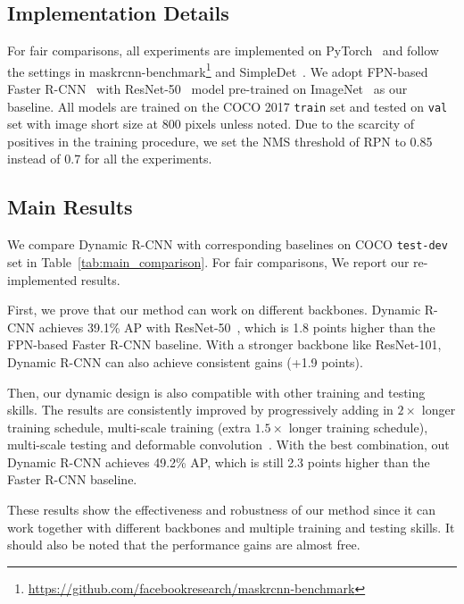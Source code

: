 \documentclass[runningheads]{llncs}
\begin{document}
\subsection{Implementation Details}

For fair comparisons, all experiments are implemented on PyTorch~\cite{PyTorch} and follow the settings in maskrcnn-benchmark\footnote[2]{\url{https://github.com/facebookresearch/maskrcnn-benchmark}} and SimpleDet~\cite{SimpleDet}. We adopt FPN-based Faster R-CNN~\cite{FasterRCNN,FPN} with ResNet-50~\cite{ResNet} model pre-trained on ImageNet~\cite{ImageNet} as our baseline. All models are trained on the COCO 2017 \texttt{train} set and tested on \texttt{val} set with image short size at 800 pixels unless noted. Due to the scarcity of positives in the training procedure, we set the NMS threshold of RPN to 0.85 instead of 0.7 for all the experiments.

\subsection{Main Results}

We compare Dynamic R-CNN with corresponding baselines on COCO \texttt{test-dev} set in Table~\ref{tab:main_comparison}. For fair comparisons, We report our re-implemented results.

First, we prove that our method can work on different backbones. Dynamic R-CNN achieves 39.1\% AP with ResNet-50~\cite{ResNet}, which is 1.8 points higher than the FPN-based Faster R-CNN baseline. With a stronger backbone like ResNet-101, Dynamic R-CNN can also achieve consistent gains (+1.9 points).

Then, our dynamic design is also compatible with other training and testing skills.
The results are consistently improved by progressively adding in $2\times$ longer training schedule, multi-scale training (extra $1.5\times$ longer training schedule), multi-scale testing and deformable convolution~\cite{DCNv2}. With the best combination, out Dynamic R-CNN achieves 49.2\% AP, which is still 2.3 points higher than the Faster R-CNN baseline.

These results show the effectiveness and robustness of our method since it can work together with different backbones and multiple training and testing skills. It should also be noted that the performance gains are almost free.
\end{document}

